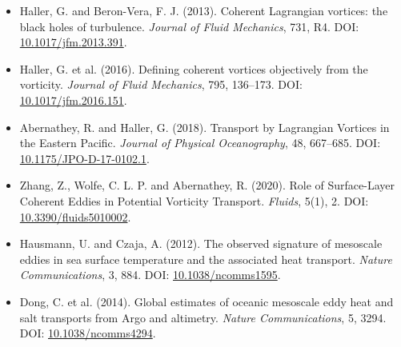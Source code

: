 \documentclass[UTF8,12pt]{ctexart}
\begin{document}
\begin{itemize}
  \item Haller, G. and Beron-Vera, F. J. (2013). Coherent Lagrangian vortices: the black holes of turbulence. \textit{Journal of Fluid Mechanics}, 731, R4. DOI: \href{https://doi.org/10.1017/jfm.2013.391}{10.1017/jfm.2013.391}.
  \item Haller, G. et al. (2016). Defining coherent vortices objectively from the vorticity. \textit{Journal of Fluid Mechanics}, 795, 136--173. DOI: \href{https://doi.org/10.1017/jfm.2016.151}{10.1017/jfm.2016.151}.
  \item Abernathey, R. and Haller, G. (2018). Transport by Lagrangian Vortices in the Eastern Pacific. \textit{Journal of Physical Oceanography}, 48, 667--685. DOI: \href{https://doi.org/10.1175/JPO-D-17-0102.1}{10.1175/JPO-D-17-0102.1}.
  \item Zhang, Z., Wolfe, C. L. P. and Abernathey, R. (2020). Role of Surface-Layer Coherent Eddies in Potential Vorticity Transport. \textit{Fluids}, 5(1), 2. DOI: \href{https://doi.org/10.3390/fluids5010002}{10.3390/fluids5010002}.
  \item Hausmann, U. and Czaja, A. (2012). The observed signature of mesoscale eddies in sea surface temperature and the associated heat transport. \textit{Nature Communications}, 3, 884. DOI: \href{https://doi.org/10.1038/ncomms1595}{10.1038/ncomms1595}.
  \item Dong, C. et al. (2014). Global estimates of oceanic mesoscale eddy heat and salt transports from Argo and altimetry. \textit{Nature Communications}, 5, 3294. DOI: \href{https://doi.org/10.1038/ncomms4294}{10.1038/ncomms4294}.
\end{itemize}
\end{document}
